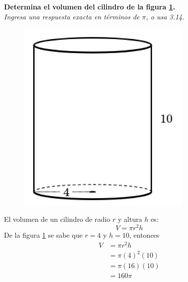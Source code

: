 \textbf{Determina el volumen del cilindro de la figura \ref{fig:vol_cil_12}.}\\
\textit{Ingresa una respuesta exacta en términos de $\pi$, o usa 3.14.}\\

\begin{minipage}[t]{0.3\linewidth}
    \begin{figure}[H]
        \centering
            \includegraphics[width=0.75\textwidth]{../images/vol_cil_12.png}
        \caption{}
        \label{fig:vol_cil_12}
    \end{figure}
\end{minipage}%
\begin{minipage}[t]{0.7\linewidth}
    \begin{solutionbox}{5cm}        El volumen de un cilindro de radio $r$ y altura $h$ es:
        \begin{equation*}
            V = \pi r^2 h
        \end{equation*}
        De la figura \ref{fig:vol_cil_12} se sabe que $r=4$ y $h=10$, entonces
        \begin{equation*}
            \begin{split}
                V & = \pi r^2 h\\
                & = \pi (4)^2 (10)\\
                & = \pi (16) (10)\\
                & = 160\pi
            \end{split}
        \end{equation*}
    \end{solutionbox}
\end{minipage}%